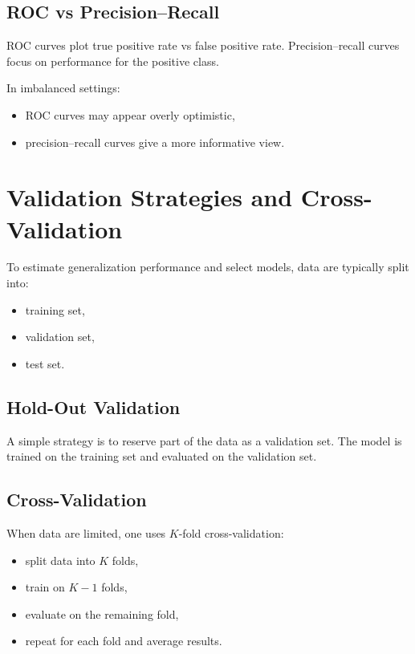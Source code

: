 \subsection{ROC vs Precision--Recall}

ROC curves plot true positive rate vs false positive rate. Precision--recall curves focus on performance for the positive class.

In imbalanced settings:
\begin{itemize}
    \item ROC curves may appear overly optimistic,
    \item precision--recall curves give a more informative view.
\end{itemize}

\section{Validation Strategies and Cross-Validation}

To estimate generalization performance and select models, data are typically split into:
\begin{itemize}
    \item training set,
    \item validation set,
    \item test set.
\end{itemize}

\subsection{Hold-Out Validation}

A simple strategy is to reserve part of the data as a validation set. The model is trained on the training set and evaluated on the validation set.

\subsection{Cross-Validation}

When data are limited, one uses $K$-fold cross-validation:
\begin{itemize}
    \item split data into $K$ folds,
    \item train on $K-1$ folds,
    \item evaluate on the remaining fold,
    \item repeat for each fold and average results.
\end{itemize}

